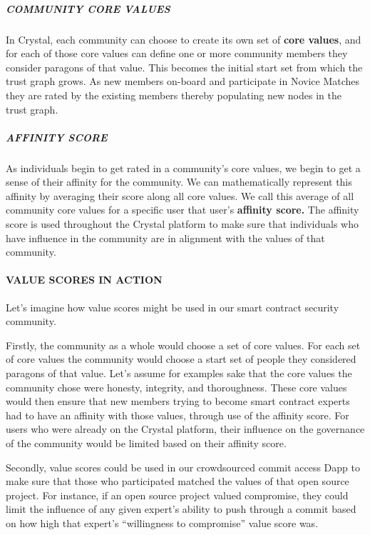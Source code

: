 \subparagraph{COMMUNITY CORE VALUES}\label{community-core-values}

In Crystal, each community can choose to create its own set of
\textbf{core values}, and for each of those core values can define one
or more community members they consider paragons of that value. This
becomes the initial start set from which the trust graph grows. As new
members on-board and participate in Novice Matches they are rated by the
existing members thereby populating new nodes in the trust graph.

\subparagraph{AFFINITY SCORE}\label{affinity-score}

As individuals begin to get rated in a community's core values, we begin
to get a sense of their affinity for the community. We can
mathematically represent this affinity by averaging their score along
all core values. We call this average of all community core values for a
specific user that user's \textbf{affinity score.} The affinity score is
used throughout the Crystal platform to make sure that individuals who
have influence in the community are in alignment with the values of that
community.

\paragraph{VALUE SCORES IN ACTION}\label{value-scores-in-action}

Let's imagine how value scores might be used in our smart contract
security community.

Firstly, the community as a whole would choose a set of core values. For
each set of core values the community would choose a start set of people
they considered paragons of that value. Let's assume for examples sake
that the core values the community chose were honesty, integrity, and
thoroughness. These core values would then ensure that new members
trying to become smart contract experts had to have an affinity with
those values, through use of the affinity score. For users who were
already on the Crystal platform, their influence on the governance of
the community would be limited based on their affinity score.

Secondly, value scores could be used in our crowdsourced commit access
Dapp to make sure that those who participated matched the values of that
open source project. For instance, if an open source project valued
compromise, they could limit the influence of any given expert's ability
to push through a commit based on how high that expert's ``willingness
to compromise'' value score was.

